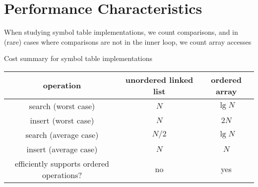 \documentclass[8pt,a4paper,compress]{beamer}
\begin{document}
\section{Performance Characteristics}
\begin{frame}[fragile]
\pause

When studying symbol table implementations, we count comparisons, and in (rare) cases where comparisons are not in the inner loop, we count array accesses

\pause
\bigskip

Cost summary for symbol table implementations
\begin{center}
\begin{tabular}{ccc}
operation & unordered linked list & ordered array \\ \hline
search (worst case) & $N$ & $\lg N$ \\
insert (worst case) & $N$ & $2N$ \\
search (average case) & $N/2$ & $\lg N$ \\
insert (average case) & $N$ & $N$ \\
efficiently supports ordered operations? & no & yes
\end{tabular} 
\end{center}
\end{frame}
\end{document}

